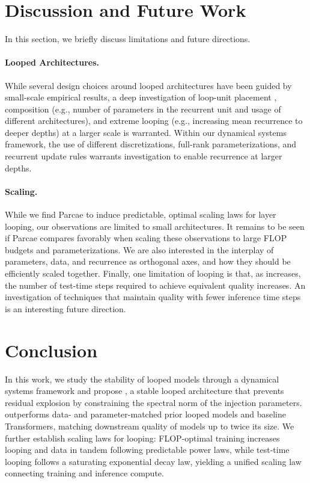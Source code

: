 \section{Discussion and Future Work}
\label{sec:lim-fut}

In this section, we briefly discuss limitations and future directions.

\paragraph{Looped Architectures.} While several design choices around looped architectures have been guided by small-scale empirical results, a deep investigation of loop-unit placement \cite{jacobs2026blockrecurrentdynamicsvisiontransformers}, composition (e.g., number of parameters in the recurrent unit and usage of different architectures), and extreme looping (e.g., increasing mean recurrence to deeper depths) at a larger scale is warranted. Within our dynamical systems framework, the use of different discretizations, full-rank parameterizations, and recurrent update rules warrants investigation to enable recurrence at larger depths.

\paragraph{Scaling.}
While we find Parcae to induce predictable, optimal scaling laws for layer looping, our observations are limited to small architectures. It remains to be seen if Parcae compares favorably when scaling these observations to large FLOP budgets and parameterizations. We are also interested in the interplay of parameters, data, and recurrence as orthogonal axes, and how they should be efficiently scaled together. Finally, one limitation of looping is that, as \meanrecurrence increases, the number of test-time steps required to achieve equivalent quality increases. An investigation of techniques that maintain quality with fewer inference time steps is an interesting future direction.







\section{Conclusion}
\label{sec:conclusion}

In this work, we study the stability of looped models through a dynamical systems framework and propose \textbf{\sysname}, a stable looped architecture that prevents residual explosion by constraining the spectral norm of the injection parameters.
\sysname outperforms data- and parameter-matched prior looped models and baseline Transformers, matching downstream quality of models up to twice its size.
We further establish scaling laws for looping: FLOP-optimal training increases looping and data in tandem following predictable power laws, while test-time looping follows a saturating exponential decay law, yielding a unified scaling law connecting training and inference compute. 

